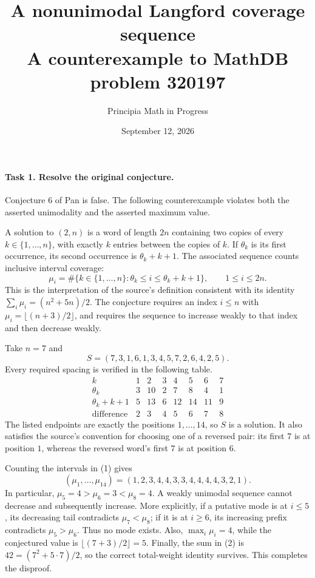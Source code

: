 \documentclass[11pt]{article}
\title{A nonunimodal Langford coverage sequence\\
\large A counterexample to MathDB problem 320197}
\author{Principia Math in Progress}
\date{September 12, 2026}
\begin{document}
\maketitle

\paragraph{Task 1. Resolve the original conjecture.}
Conjecture 6 of Pan \cite[p.~4]{Pan} is false. The following
counterexample violates both the asserted unimodality and the
asserted maximum value.

A solution to \((2,n)\) is a word of length \(2n\) containing two
copies of every \(k\in\{1,\ldots,n\}\), with exactly \(k\) entries
between the copies of \(k\). If \(\theta_k\) is its first occurrence,
its second occurrence is \(\theta_k+k+1\).
The associated sequence counts inclusive interval coverage:
\[
 \mu_i=\#\{k\in\{1,\ldots,n\}:\theta_k\le i\le\theta_k+k+1\},
 \qquad 1\le i\le2n.
 \tag{1}
\]
This is the interpretation of the source's definition consistent
with its identity \(\sum_i\mu_i=(n^2+5n)/2\).
The conjecture requires an index \(i\le n\) with
\(\mu_i=\lfloor(n+3)/2\rfloor\), and requires the sequence to
increase weakly to that index and then decrease weakly.

Take \(n=7\) and
\[
 S=(7,3,1,6,1,3,4,5,7,2,6,4,2,5).
\]
Every required spacing is verified in the following table.
\[
\begin{array}{c|rrrrrrr}
 k&1&2&3&4&5&6&7\\ \hline
 \theta_k&3&10&2&7&8&4&1\\
 \theta_k+k+1&5&13&6&12&14&11&9\\
 \text{difference}&2&3&4&5&6&7&8
\end{array}
\]
The listed endpoints are exactly the positions \(1,\ldots,14\),
so \(S\) is a solution. It also satisfies the source's convention
for choosing one of a reversed pair: its first \(7\) is at position
\(1\), whereas the reversed word's first \(7\) is at position \(6\).

Counting the intervals in (1) gives
\[
 (\mu_1,\ldots,\mu_{14})
 =(1,2,3,4,4,3,3,4,4,4,4,3,2,1).
 \tag{2}
\]
In particular, \(\mu_5=4>\mu_6=3<\mu_8=4\). A weakly unimodal
sequence cannot decrease and subsequently increase. More explicitly,
if a putative mode is at \(i\le5\), its decreasing tail contradicts
\(\mu_7<\mu_8\); if it is at \(i\ge6\), its increasing prefix
contradicts \(\mu_5>\mu_6\). Thus no mode exists.
Also, \(\max_i\mu_i=4\), while the conjectured value is
\(\lfloor(7+3)/2\rfloor=5\).
Finally, the sum in (2) is \(42=(7^2+5\cdot7)/2\), so the correct
total-weight identity survives. This completes the disproof.
\end{document}
